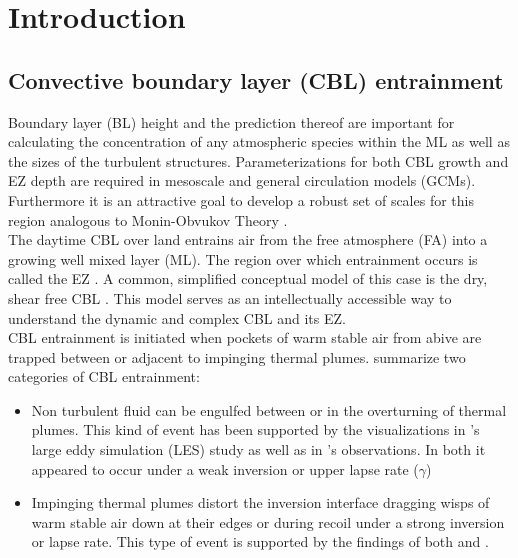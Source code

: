 \section{Introduction}
\label{intro}


\subsection{Convective boundary layer (CBL) entrainment}
\label{sec:cblent}
Boundary layer (BL) height and the prediction thereof are important for calculating the concentration of any atmospheric species within the ML as well as the sizes of the turbulent structures.  Parameterizations for both CBL growth and EZ depth are required in mesoscale and general circulation models (GCMs).  Furthermore it is an attractive goal to develop a robust set of scales for this region analogous to Monin-Obvukov Theory \citep{Stull-BLMetIntro, Traum11, SteynBaldHoff, StullNelEl, Sorbjan1}.\\

The daytime CBL over land entrains air from the free atmosphere (FA) into a growing well mixed layer (ML).  The region over which entrainment occurs is called the EZ \citep{DearWill80}. A common, simplified conceptual model of this case is the dry, shear free CBL \citep{SullMoengStev, FedConzMir04, BrooksFowler2}. This model serves as an intellectually accessible way to understand the dynamic and complex CBL and its EZ.\\  

CBL entrainment is initiated when pockets of warm stable air from abive are trapped between or adjacent to impinging thermal plumes.  \citep{Traum11} summarize two categories of CBL entrainment:\\

\begin{itemize}

\item{Non turbulent fluid can be engulfed between or in the overturning of thermal plumes. This kind of event has been supported by the visualizations in \cite{SullMoengStev}'s large eddy simulation (LES) study as well as in \cite{Traum11}'s observations. In both it appeared to occur under a weak inversion or upper lapse rate ($\gamma$)}

\item{
Impinging thermal plumes distort the inversion interface dragging wisps of warm stable air down at their edges or during recoil under a strong inversion or lapse rate. This type of event is supported by the findings  of both \cite{SullMoengStev} and \cite{Traum11}.}

\end{itemize}


